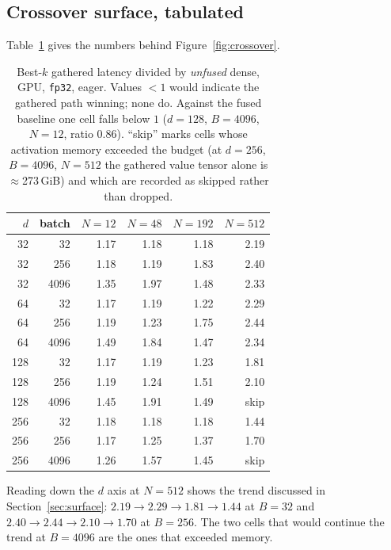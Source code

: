 \subsection{Crossover surface, tabulated}
\label{app:surface}

Table~\ref{tab:surface} gives the numbers behind Figure~\ref{fig:crossover}.

\begin{table}[t]
\centering
\small
\caption{Best-$k$ gathered latency divided by \emph{unfused} dense, GPU,
\texttt{fp32}, eager. Values $<1$ would indicate the gathered path winning;
none do. Against the fused baseline one cell falls below $1$ ($d{=}128$,
$B{=}4096$, $N{=}12$, ratio $0.86$). ``skip'' marks cells whose activation
memory exceeded the budget (at $d{=}256$, $B{=}4096$, $N{=}512$ the gathered
value tensor alone is $\approx$273\,GiB) and which are recorded as skipped
rather than dropped.}
\label{tab:surface}
\begin{tabular}{rrrrrr}
\toprule
$d$ & batch & $N{=}12$ & $N{=}48$ & $N{=}192$ & $N{=}512$ \\
\midrule
32  & 32   & 1.17 & 1.18 & 1.18 & 2.19 \\
32  & 256  & 1.18 & 1.19 & 1.83 & 2.40 \\
32  & 4096 & 1.35 & 1.97 & 1.48 & 2.33 \\
64  & 32   & 1.17 & 1.19 & 1.22 & 2.29 \\
64  & 256  & 1.19 & 1.23 & 1.75 & 2.44 \\
64  & 4096 & 1.49 & 1.84 & 1.47 & 2.34 \\
128 & 32   & 1.17 & 1.19 & 1.23 & 1.81 \\
128 & 256  & 1.19 & 1.24 & 1.51 & 2.10 \\
128 & 4096 & 1.45 & 1.91 & 1.49 & skip \\
256 & 32   & 1.18 & 1.18 & 1.18 & 1.44 \\
256 & 256  & 1.17 & 1.25 & 1.37 & 1.70 \\
256 & 4096 & 1.26 & 1.57 & 1.45 & skip \\
\bottomrule
\end{tabular}
\end{table}

Reading down the $d$ axis at $N{=}512$ shows the trend discussed in
Section~\ref{sec:surface}: $2.19 \to 2.29 \to 1.81 \to 1.44$ at $B{=}32$ and
$2.40 \to 2.44 \to 2.10 \to 1.70$ at $B{=}256$. The two cells that would
continue the trend at $B{=}4096$ are the ones that exceeded memory.

